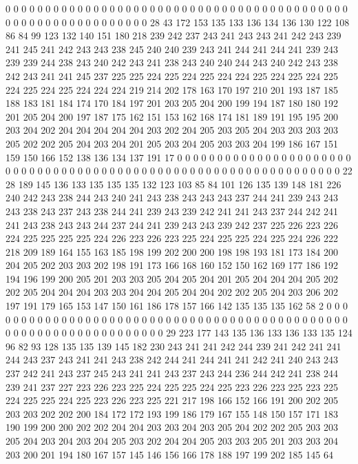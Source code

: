 0 0 0 0 0 0 0 0 0 0 0 0 0 0 0 0 0 0 0 0
0 0 0 0 0 0 0 0 0 0 0 0 0 0 0 0 0 0 0 0
0 0 0 0 0 0 0 0 0 0 0 0 0 0 0 0 0 0 0 0
0 28 43 172 153 135 133 136 134 136 130 122 108 86 84 99 123 132 140 151
180 218 239 242 237 243 241 243 243 241 242 243 239 241 245 241 242 243 243 238
245 240 240 239 243 241 244 241 244 241 239 243 239 239 244 238 243 240 242 243
241 238 243 240 240 244 243 240 242 243 238 242 243 241 241 245 237 225 225 224
225 224 225 224 224 225 224 225 224 225 224 225 224 225 224 224 224 219 214 202
178 163 170 197 210 201 193 187 185 188 183 181 184 174 170 184 197 201 203 205
204 200 199 194 187 180 180 192 201 205 204 200 197 187 175 162 151 153 162 168
174 181 189 191 195 195 200 203 204 202 204 204 204 204 204 203 202 204 205 203
205 204 203 203 203 203 205 202 202 205 204 203 204 201 205 203 204 205 203 203
204 199 186 167 151 159 150 166 152 138 136 134 137 191 17 0 0 0 0 0
0 0 0 0 0 0 0 0 0 0 0 0 0 0 0 0 0 0 0 0
0 0 0 0 0 0 0 0 0 0 0 0 0 0 0 0 0 0 0 0
0 0 0 0 0 0 0 0 0 0 0 0 0 0 0 0 0 0 0 22
28 189 145 136 133 135 135 135 132 123 103 85 84 101 126 135 139 148 181 226
240 242 243 238 244 243 240 241 243 238 243 243 243 237 244 241 239 243 243 243
238 243 237 243 238 244 241 239 243 239 242 241 241 243 237 244 242 241 241 243
238 243 243 244 237 244 241 239 243 243 239 242 237 225 226 223 226 224 225 225
225 225 224 226 223 226 223 225 224 225 225 224 225 224 226 222 218 209 189 164
155 163 185 198 199 202 200 200 198 198 193 181 173 184 200 204 205 202 203 203
202 198 191 173 166 168 160 152 150 162 169 177 186 192 194 196 199 200 205 201
203 203 205 204 205 204 201 205 204 204 204 205 202 202 205 204 204 204 203 203
204 204 205 204 204 202 202 205 204 203 206 202 197 191 179 165 153 147 150 161
186 178 157 166 142 135 135 135 162 58 2 0 0 0 0 0 0 0 0 0
0 0 0 0 0 0 0 0 0 0 0 0 0 0 0 0 0 0 0 0
0 0 0 0 0 0 0 0 0 0 0 0 0 0 0 0 0 0 0 0
0 0 0 0 0 0 0 0 0 0 0 0 0 0 0 0 0 29 223 177
143 135 136 133 136 133 135 124 96 82 93 128 135 135 139 145 182 230 243 241
241 242 244 239 241 242 241 241 244 243 237 243 241 241 243 238 242 244 241 244
241 241 242 241 240 243 243 237 242 241 243 237 245 243 241 241 243 237 243 244
236 244 242 241 238 244 239 241 237 227 223 226 223 225 224 225 225 224 225 223
226 223 225 223 225 224 225 225 224 225 223 226 223 225 221 217 198 166 152 166
191 200 202 205 203 203 202 202 200 184 172 172 193 199 186 179 167 155 148 150
157 171 183 190 199 200 200 202 202 204 204 203 203 204 203 205 204 202 202 205
203 203 205 204 203 204 203 204 205 203 202 204 204 205 203 203 205 201 203 203
204 203 200 201 194 180 167 157 145 146 156 166 178 188 197 199 202 185 145 64
